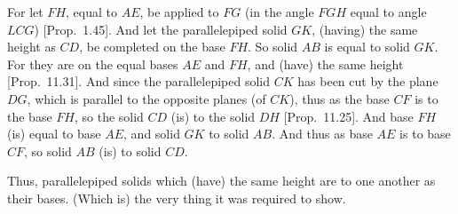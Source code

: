 \begin{Parallel}{}{}
{For let $FH$, equal to $AE$, be applied to $FG$ (in the angle
$FGH$ equal to angle $LCG$) [Prop.~1.45]. And let the parallelepiped solid $GK$, (having) the same height as $CD$, 
be completed on the base $FH$. So solid $AB$ is equal to solid
$GK$. For they are on the equal bases $AE$ and $FH$, and
(have) the same height [Prop.~11.31]. 
And since the parallelepiped solid $CK$ has been cut by the plane
$DG$, which is parallel to the opposite planes (of $CK$), thus as
the base $CF$ is to the base $FH$, so the solid $CD$ (is) to the
solid $DH$ [Prop.~11.25]. And  base
$FH$ (is) equal to base $AE$, and solid $GK$ to solid $AB$. And thus
as base $AE$ is to base $CF$, so solid $AB$ (is) to solid $CD$.

Thus, parallelepiped solids which (have) the same height
are to one another as their bases. (Which is) the very thing it was required to
show.}
\end{Parallel}

